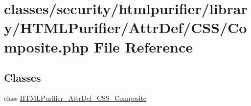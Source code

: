 \hypertarget{AttrDef_2CSS_2Composite_8php}{\section{classes/security/htmlpurifier/library/\+H\+T\+M\+L\+Purifier/\+Attr\+Def/\+C\+S\+S/\+Composite.php File Reference}
\label{AttrDef_2CSS_2Composite_8php}
}
\subsection*{Classes}
\begin{DoxyCompactItemize}
\item 
class \hyperlink{classHTMLPurifier__AttrDef__CSS__Composite}{H\+T\+M\+L\+Purifier\+\_\+\+Attr\+Def\+\_\+\+C\+S\+S\+\_\+\+Composite}
\end{DoxyCompactItemize}
